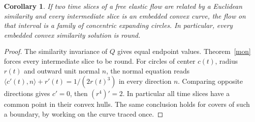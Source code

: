 \documentclass[10pt]{article}
\newtheorem{corollary}[theorem]{Corollary}
\begin{document}
\begin{corollary}\label{breath}
If two time slices of a free elastic flow are related by a Euclidean
similarity and every intermediate slice is an embedded convex curve,
the flow on that interval is a family of concentric expanding circles.
In particular, every embedded convex similarity solution is round.
\end{corollary}
\begin{proof}
The similarity invariance of \(Q\) gives equal endpoint values.
Theorem~\ref{mon} forces every intermediate slice to be round.
For circles of center \(c(t)\), radius \(r(t)\) and outward unit normal
\(n\), the normal equation reads
\(\langle c'(t),n\rangle+r'(t)=1/(2r(t)^3)\) in every direction \(n\).
Comparing opposite directions gives \(c'=0\), then
\((r^4)'=2\). In particular all time slices have a common point in their
convex hulls. The same conclusion holds for covers of such a boundary,
by working on the curve traced once.
\end{proof}
\end{document}
